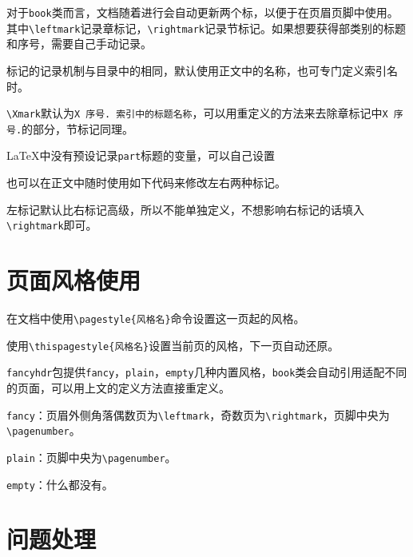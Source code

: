 \documentclass[10pt,openany]{book}
\begin{document}
对于\texttt{book}类而言，文档随着进行会自动更新两个标，以便于在页眉页脚中使用。其中\texttt{\textbackslash{}leftmark}记录章标记，\texttt{\textbackslash{}rightmark}记录节标记。如果想要获得部类别的标题和序号，需要自己手动记录。

标记的记录机制与目录中的相同，默认使用正文中的名称，也可专门定义索引名时。



\texttt{\textbackslash{}Xmark}默认为\texttt{X\ 序号.\ 索引中的标题名称}，可以用重定义的方法来去除章标记中\texttt{X\ 序号.}的部分，节标记同理。



\LaTeX 中没有预设记录\texttt{part}标题的变量，可以自己设置



也可以在正文中随时使用如下代码来修改左右两种标记。



左标记默认比右标记高级，所以不能单独定义，不想影响右标记的话填入\texttt{\textbackslash{}rightmark}即可。

\section{页面风格使用}

在文档中使用\texttt{\textbackslash{}pagestyle\{风格名\}}命令设置这一页起的风格。

使用\texttt{\textbackslash{}thispagestyle\{风格名\}}设置当前页的风格，下一页自动还原。

\texttt{fancyhdr}包提供\texttt{fancy}，\texttt{plain}，\texttt{empty}几种内置风格，\texttt{book}类会自动引用适配不同的页面，可以用上文的定义方法直接重定义。

\texttt{fancy}：页眉外侧角落偶数页为\texttt{\textbackslash{}leftmark}，奇数页为\texttt{\textbackslash{}rightmark}，页脚中央为\texttt{\textbackslash{}pagenumber}。

\texttt{plain}：页脚中央为\texttt{\textbackslash{}pagenumber}。

\texttt{empty}：什么都没有。

\section{问题处理}
\end{document}

